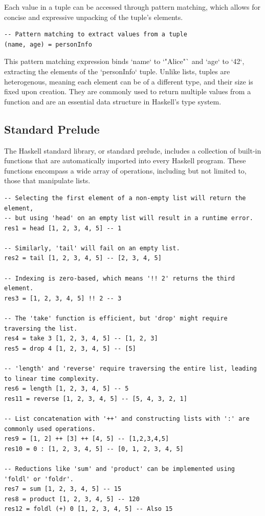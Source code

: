 \documentclass[a4paper, 10pt]{article}
\begin{document}
            Each value in a tuple can be accessed through pattern matching, which allows for concise and expressive unpacking of the tuple's elements.

            \begin{lstlisting}
-- Pattern matching to extract values from a tuple
(name, age) = personInfo
            \end{lstlisting}

            This pattern matching expression binds `name` to `"Alice"` and `age` to `42`, extracting the elements of the `personInfo` tuple. Unlike lists, tuples are heterogenous, meaning each element can be of a different type, and their size is fixed upon creation. They are commonly used to return multiple values from a function and are an essential data structure in Haskell's type system.


        \subsection{Standard Prelude}

            The Haskell standard library, or standard prelude, includes a collection of built-in functions that are automatically imported into every Haskell program. These functions encompass a wide array of operations, including but not limited to, those that manipulate lists.

            \lstset{language=Haskell}
            \begin{lstlisting}
-- Selecting the first element of a non-empty list will return the element,
-- but using 'head' on an empty list will result in a runtime error.
res1 = head [1, 2, 3, 4, 5] -- 1

-- Similarly, 'tail' will fail on an empty list.
res2 = tail [1, 2, 3, 4, 5] -- [2, 3, 4, 5]

-- Indexing is zero-based, which means '!! 2' returns the third element.
res3 = [1, 2, 3, 4, 5] !! 2 -- 3

-- The 'take' function is efficient, but 'drop' might require traversing the list.
res4 = take 3 [1, 2, 3, 4, 5] -- [1, 2, 3]
res5 = drop 4 [1, 2, 3, 4, 5] -- [5]

-- 'length' and 'reverse' require traversing the entire list, leading to linear time complexity.
res6 = length [1, 2, 3, 4, 5] -- 5
res11 = reverse [1, 2, 3, 4, 5] -- [5, 4, 3, 2, 1]

-- List concatenation with '++' and constructing lists with ':' are commonly used operations.
res9 = [1, 2] ++ [3] ++ [4, 5] -- [1,2,3,4,5]
res10 = 0 : [1, 2, 3, 4, 5] -- [0, 1, 2, 3, 4, 5]

-- Reductions like 'sum' and 'product' can be implemented using 'foldl' or 'foldr'.
res7 = sum [1, 2, 3, 4, 5] -- 15
res8 = product [1, 2, 3, 4, 5] -- 120
res12 = foldl (+) 0 [1, 2, 3, 4, 5] -- Also 15
            \end{lstlisting}
\end{document}
